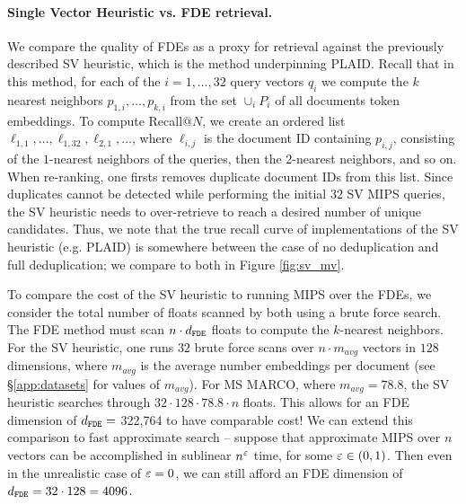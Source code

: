 \paragraph{Single Vector Heuristic vs. FDE retrieval.}
We compare the quality of FDEs as a proxy for retrieval against the previously described SV heuristic, which is the method underpinning PLAID.
Recall that in this method, for each of the $i=1,\dots,32$ query vectors $q_i$ we compute the $k$ nearest neighbors $p_{1,i},\dots,p_{k,i}$ from the set $\cup_{i} P_i$ of all documents token embeddings. To compute Recall$@N$, 
we create an ordered list $\ell_{1,1},\dots,\ell_{1,32}, \ell_{2,1},\dots$, where $\ell_{i,j}$ is the document ID containing $p_{i,j}$, consisting of the $1$-nearest neighbors of the queries, then the $2$-nearest neighbors, and so on. When re-ranking, one firsts removes duplicate document IDs from this list. Since duplicates cannot be detected while performing the initial $32$ SV MIPS queries, the SV heuristic needs to over-retrieve to reach a desired number of unique candidates. Thus, we note that the true recall curve of implementations of the SV heuristic (e.g. PLAID) is somewhere between the case of no deduplication and full deduplication; we compare to both in Figure \ref{fig:sv_mv}. 

 

To compare the cost of the SV heuristic to running MIPS over the FDEs, we consider the total number of floats scanned by both using a brute force search. 
The FDE method must scan $n\cdot d_{\texttt{FDE}}$ floats to compute the $k$-nearest neighbors. For the SV heuristic, one runs $32$ brute force scans over $n\cdot m_{avg}$ vectors in $128$ dimensions, where $m_{avg}$ is the average number  embeddings per document (see §\ref{app:datasets} for values of $m_{avg}$). For MS MARCO, where $m_{avg} = 78.8$, the SV heuristic searches through $32 \cdot 128 \cdot 78.8 \cdot n$ floats. This allows for an FDE dimension of $d_{\texttt{FDE}} =$ 322,764 to have comparable cost! We can extend this comparison to fast approximate search -- suppose that approximate MIPS over $n$ vectors can be accomplished in sublinear $n^\varepsilon$ time, for some $\varepsilon \in (0,1)$. Then even in the unrealistic case of $\varepsilon=0$, we can still afford an FDE dimension of $d_{\texttt{FDE}} = 32\cdot 128 = 4096$.

